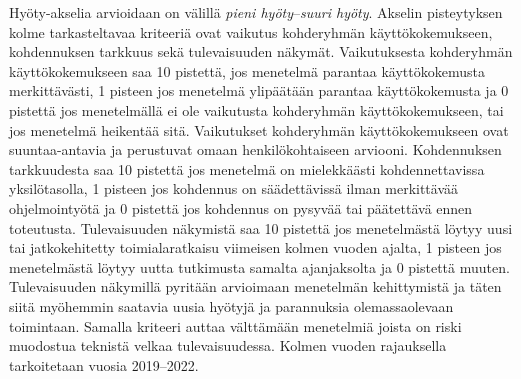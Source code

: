 \documentclass[finnish, 12pt, a4paper, elec, utf8, a-1b, online]{aaltothesis}
\begin{document}
Hyöty-akselia arvioidaan on välillä \textit{pieni hyöty}--\textit{suuri hyöty}.
Akselin pisteytyksen kolme tarkasteltavaa kriteeriä ovat vaikutus kohderyhmän
käyttökokemukseen, kohdennuksen tarkkuus sekä tulevaisuuden näkymät.
Vaikutuksesta kohderyhmän käyttökokemukseen saa 10 pistettä, jos menetelmä
parantaa käyttökokemusta merkittävästi, 1 pisteen jos menetelmä ylipäätään
parantaa käyttökokemusta ja 0 pistettä jos menetelmällä ei ole vaikutusta
kohderyhmän käyttökokemukseen, tai jos menetelmä heikentää sitä. Vaikutukset
kohderyhmän käyttökokemukseen ovat suuntaa-antavia ja perustuvat omaan
henkilökohtaiseen arviooni. Kohdennuksen tarkkuudesta saa 10 pistettä jos
menetelmä on mielekkäästi kohdennettavissa yksilötasolla, 1 pisteen jos
kohdennus on säädettävissä ilman merkittävää ohjelmointyötä ja 0 pistettä jos
kohdennus on pysyvää tai päätettävä ennen toteutusta. Tulevaisuuden näkymistä
saa 10 pistettä jos menetelmästä löytyy uusi tai jatkokehitetty toimialaratkaisu
viimeisen kolmen vuoden ajalta, 1 pisteen jos menetelmästä löytyy uutta
tutkimusta samalta ajanjaksolta ja 0 pistettä muuten. Tulevaisuuden näkymillä
pyritään arvioimaan menetelmän kehittymistä ja täten siitä myöhemmin saatavia
uusia hyötyjä ja parannuksia olemassaolevaan toimintaan. Samalla kriteeri auttaa
välttämään menetelmiä joista on riski muodostua teknistä velkaa tulevaisuudessa.
Kolmen vuoden rajauksella tarkoitetaan vuosia 2019--2022.
\end{document}
